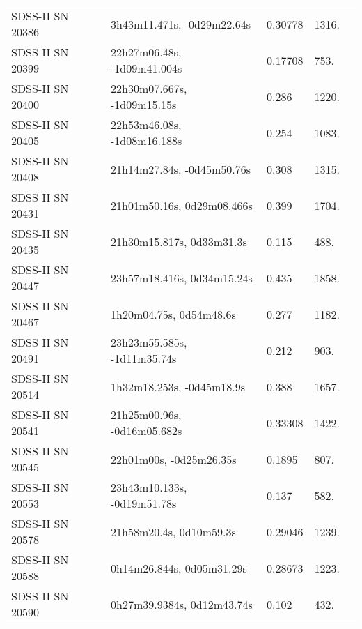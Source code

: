 \begin{longtable}{lllll}
 SDSS-II SN 20386 &     3h43m11.471s, -0d29m22.64s &  0.30778 &          1316. &    \citet{2016SDSSD.C...0000:} \\
 SDSS-II SN 20399 &    22h27m06.48s, -1d09m41.004s &  0.17708 &           753. &    \citet{2016SDSSD.C...0000:} \\
 SDSS-II SN 20400 &    22h30m07.667s, -1d09m15.15s &    0.286 &          1220. &    \citet{2011ApJ...738..162S} \\
 SDSS-II SN 20405 &    22h53m46.08s, -1d08m16.188s &    0.254 &          1083. &    \citet{2011ApJ...738..162S} \\
 SDSS-II SN 20408 &     21h14m27.84s, -0d45m50.76s &    0.308 &          1315. &    \citet{2011ApJ...738..162S} \\
 SDSS-II SN 20431 &     21h01m50.16s, 0d29m08.466s &    0.399 &          1704. &    \citet{2011ApJ...738..162S} \\
 SDSS-II SN 20435 &      21h30m15.817s, 0d33m31.3s &    0.115 &           488. &    \citet{2011ApJ...738..162S} \\
 SDSS-II SN 20447 &     23h57m18.416s, 0d34m15.24s &    0.435 &          1858. &    \citet{2011ApJ...738..162S} \\
 SDSS-II SN 20467 &        1h20m04.75s, 0d54m48.6s &    0.277 &          1182. &    \citet{2010ApJ...713.1026D} \\
 SDSS-II SN 20491 &    23h23m55.585s, -1d11m35.74s &    0.212 &           903. &    \citet{2011ApJ...738..162S} \\
 SDSS-II SN 20514 &      1h32m18.253s, -0d45m18.9s &    0.388 &          1657. &    \citet{2010ApJ...713.1026D} \\
 SDSS-II SN 20541 &    21h25m00.96s, -0d16m05.682s &  0.33308 &          1422. &    \citet{2016SDSSD.C...0000:} \\
 SDSS-II SN 20545 &        22h01m00s, -0d25m26.35s &   0.1895 &           807. &    \citet{2011ApJ...738..162S} \\
 SDSS-II SN 20553 &    23h43m10.133s, -0d19m51.78s &    0.137 &           582. &    \citet{2011ApJ...738..162S} \\
 SDSS-II SN 20578 &        21h58m20.4s, 0d10m59.3s &  0.29046 &          1239. &    \citet{2004SDSS2.C...0000:} \\
 SDSS-II SN 20588 &      0h14m26.844s, 0d05m31.29s &  0.28673 &          1223. &    \citet{2016SDSSD.C...0000:} \\
 SDSS-II SN 20590 &     0h27m39.9384s, 0d12m43.74s &    0.102 &           432. &    \citet{2011ApJ...738..162S} \\

\end{longtable}
